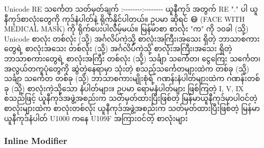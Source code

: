 \documentclass[11pt]{article}
\begin{document}
    \textbar{} Unicode RE သင်္ကေတ \textbar{} သတ်မှတ်ချက် \textbar{}
\textbar{}:-\/-\/-\/-\/-\/-\/-\/-\textbar{}:-\/-\/-\/-\/-\/-\/-\/-\textbar{}
\textbar{} \X \textbar{} ယူနီကုဒ် အတွက် RE "." ပါ\textbar{} \textbar{}
 \textbar{} ယူနီကုဒ်စာလုံးတွေကို ကုဒ်နံပါတ်နဲ့ ရိုက်နိုင်ပါတယ်။
ဥပမာ  ဆိုရင် 😷 (FACE WITH MEDICAL MASK) ကို ရိုက်ပေးပါလိမ့်မယ်။
\textbar{} \textbar{} \textbar{} မြန်မာစာ စာလုံး "က" ကို
၁၀ခါ \textbar{} \textbar{}  (သို့) \textbar{} Unicode
စာလုံး တစ်လုံး \textbar{} \textbar{}  (သို့) 
\textbar{} အင်္ဂလိပ်ကဲ့သို့ စာလုံးအကြီး၊အသေး ရှိတဲ့ ဘာသာစကားတွေရဲ့
စာလုံးအသေး တစ်လုံး\textbar{} \textbar{}  (သို့)
 \textbar{} အင်္ဂလိပ်ကဲ့သို့ စာလုံးအကြီး၊အသေး ရှိတဲ့
ဘာသာစကားတွေရဲ့ စာလုံးအကြီး တစ်လုံး\textbar{} \textbar{}  (သို့)
 \textbar{} သင်္ချာ သင်္ကေတ၊ ငွေကြေး သင်္ကေတ၊
အလွယ်တကူပုံတွေကို ဆွဲတဲ့နေရာမှာ သုံးတဲ့ စသည့်သင်္ကေတများထဲက
တစ်ခု\textbar{} \textbar{} (သို့) \textbar{}
သင်္ချာ သင်္ကေတ တစ်ခု \textbar{} \textbar{}  (သို့)
\textbar{} ဘာသာစကားမျိုးစုံရဲ့ ဂဏန်းနံပါတ်များထဲက
ဂဏန်းတစ်ခု\textbar{} \textbar{}  (သို့) 
\textbar{} စာလုံးကဲ့သို့သော နံပါတ်များ။ ဥပမာ ရောမနံပါတ်များ ဖြစ်ကြတဲ့ I,
V, IX စသည်ဖြင့် \textbar{} \textbar{}\textbar{}
ယူနီကုဒ်အဖွဲ့အစည်းက သတ်မှတ်ထားပြီးဖြစ်တဲ့ မြန်မာယူနီကုဒ်မှာပါဝင်တဲ့
စာလုံးများထဲက စာလုံးတစ်လုံး \textbar{} \textbar{}\textbar{}
ယူနီကုဒ်အဖွဲ့အစည်းက သတ်မှတ်ထားပြီးဖြစ်တဲ့ မြန်မာယူနီကုဒ်နံပါတ် U1000 ကနေ
U109F အကြားဝင်တဲ့ စာလုံးများ\textbar{}\textbar{}

    \subsubsection{Inline Modifier}\label{inline-modifier}
\end{document}
